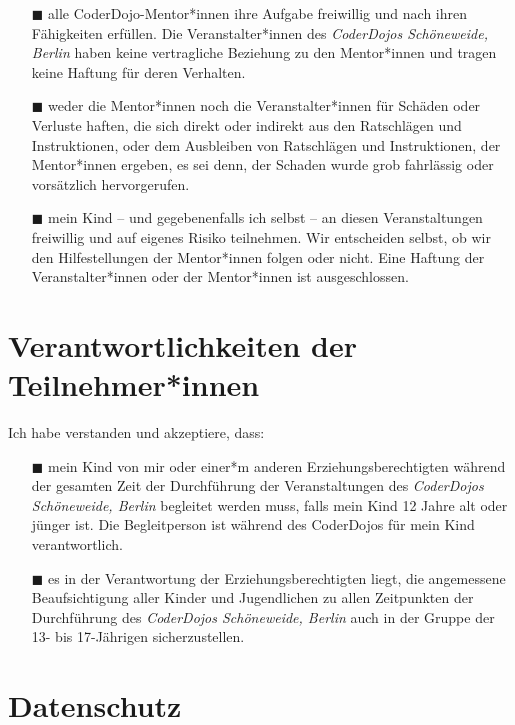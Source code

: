 \documentclass{coderdojoschoeneweide}
\begin{document}
\begin{Form}
	\begin{itemize}
		\item[$\blacksquare$] alle CoderDojo-Mentor*innen ihre Aufgabe freiwillig und nach ihren Fähigkeiten erfüllen.
			Die Veranstalter*innen des \textit{CoderDojos Schöneweide, Berlin} haben keine vertragliche Beziehung zu den Mentor*innen und tragen keine Haftung für deren Verhalten.
		\item[$\blacksquare$] weder die Mentor*innen noch die Veranstalter*innen für Schäden oder Verluste haften, die sich direkt oder indirekt aus den Ratschlägen und Instruktionen, oder dem Ausbleiben von Ratschlägen und Instruktionen, der Mentor*innen ergeben, es sei denn, der Schaden wurde grob fahrlässig oder vorsätzlich hervorgerufen.
		\item[$\blacksquare$] mein Kind – und gegebenenfalls ich selbst – an diesen Veranstaltungen freiwillig und auf eigenes Risiko teilnehmen.
			Wir entscheiden selbst, ob wir den Hilfestellungen der Mentor*innen folgen oder nicht.
			Eine Haftung der Veranstalter*innen oder der Mentor*innen ist ausgeschlossen.
	\end{itemize}

	\section*{Verantwortlichkeiten der Teilnehmer*innen}
	
	Ich habe verstanden und akzeptiere, dass:
	
	\begin{itemize}
	\item[$\blacksquare$] mein Kind von mir oder einer*m anderen Erziehungsberechtigten während der gesamten Zeit der Durchführung der Veranstaltungen des \textit{CoderDojos Schöneweide, Berlin} begleitet werden muss, falls mein Kind 12 Jahre alt oder jünger ist. Die Begleitperson ist während des CoderDojos für mein Kind verantwortlich.
	
	\item[$\blacksquare$] es in der Verantwortung der Erziehungsberechtigten liegt, die angemessene Beaufsichtigung aller Kinder und Jugendlichen zu allen Zeitpunkten der Durchführung des \textit{CoderDojos Schöneweide, Berlin} auch in der Gruppe der 13- bis 17-Jährigen sicherzustellen.
	\end{itemize}
	
	\section*{Datenschutz}
	

\end{Form}
\end{document}
